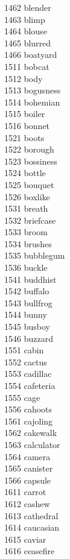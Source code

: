 1462 blender \\
1463 blimp \\
1464 blouse \\
1465 blurred \\
1466 boatyard \\
1511 bobcat \\
1512 body \\
1513 bogusness \\
1514 bohemian \\
1515 boiler \\
1516 bonnet \\
1521 boots \\
1522 borough \\
1523 bossiness \\
1524 bottle \\
1525 bouquet \\
1526 boxlike \\
1531 breath \\
1532 briefcase \\
1533 broom \\
1534 brushes \\
1535 bubblegum \\
1536 buckle \\
1541 buddhist \\
1542 buffalo \\
1543 bullfrog \\
1544 bunny \\
1545 busboy \\
1546 buzzard \\
1551 cabin \\
1552 cactus \\
1553 cadillac \\
1554 cafeteria \\
1555 cage \\
1556 cahoots \\
1561 cajoling \\
1562 cakewalk \\
1563 calculator \\
1564 camera \\
1565 canister \\
1566 capsule \\
1611 carrot \\
1612 cashew \\
1613 cathedral \\
1614 caucasian \\
1615 caviar \\
1616 ceasefire \\
